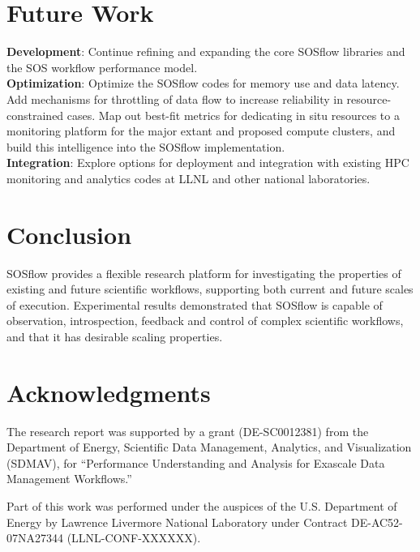 

\section{Future Work} %
%
\textbf{Development}: Continue refining and expanding the core SOSflow
libraries and the SOS workflow performance model.
\\
\textbf{Optimization}: Optimize the SOSflow codes for memory use
and data latency. Add mechanisms for throttling of data flow to
increase reliability in resource-constrained cases. Map out 
best-fit metrics for dedicating in situ resources to a monitoring
platform for the major extant and proposed compute clusters, and build this
intelligence into the SOSflow implementation.
\\
\textbf{Integration}: Explore options for deployment and integration with
existing HPC monitoring and analytics codes at LLNL and other
national laboratories.
%
%

\section{Conclusion}
%
SOSflow provides a flexible research platform for investigating the
properties of existing and future scientific workflows, supporting
both current and future scales of execution.
%
Experimental results demonstrated that SOSflow is capable of
observation, introspection, feedback and control of complex scientific
workflows, and that it has desirable scaling properties.
%
%


\section{Acknowledgments}

The research report was supported by a grant (DE-SC0012381) from the
Department of Energy, Scientific Data Management, Analytics, and
Visualization (SDMAV), for ``Performance Understanding and Analysis
for Exascale Data Management Workflows.''

Part of this work was performed under the auspices of the
U.S. Department of Energy by Lawrence Livermore National Laboratory
under Contract DE-AC52-07NA27344 (LLNL-CONF-XXXXXX).



